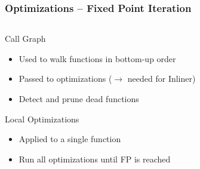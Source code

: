 \documentclass[navbaroff,en]{sdqbeamer}
\begin{document}
\begin{frame}
	\frametitle{Optimizations -- Fixed Point Iteration}

	\begin{columns}
		\begin{column}{0.48\textwidth}
			\begin{contentblock}{Call Graph}
				\begin{itemize}
					\item Used to walk functions in bottom-up order
					\item Passed to optimizations ($\rightarrow$ needed for Inliner)
					\item Detect and prune dead functions
				\end{itemize}
			\end{contentblock}

			\begin{contentblock}{Local Optimizations}
				\begin{itemize}
					\item Applied to a single function
					\item Run all optimizations until FP is reached
				\end{itemize}
			\end{contentblock}


\end{column}
\end{columns}
\end{frame}
\end{document}
